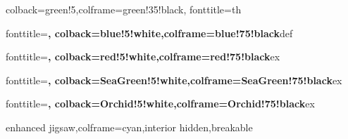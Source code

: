 
\theoremstyle{normalit}
\newtheorem{theorem}{Theorem}[section]
\newtheorem{lemma}{Lemma}[section]
\newtheorem{corollary}{Corollary}[section]
\newtheorem{proposition}{Proposition}[section]
\newtheorem*{theorem*}{Theorem}

\theoremstyle{thmit}
\newtheorem*{solution}{Solution}
\newtheorem*{fsolution}{Solution}

\theoremstyle{normal}
\newtheorem{example}{Example}[section]
\newtheorem{definition}{Definition}[section]
\newtheorem{problem}{Problem}[section]
\newtheorem{question}{Question}[section]
\newtheorem{remark}{Remark}[section]
\newtheorem{properties}{Properties}[section]
\newtheorem{notation}{Notation}[section]
\newtheorem{axiom}{Axiom}[section]
\newtheorem*{properties*}{Properties}
\newtheorem*{remark*}{Remark}
\newtheorem*{definition*}{Definition}
\theoremstyle{plain}

%
    {colback=green!5,colframe=green!35!black,
     fonttitle=\bfseries\upshape}{th}

%
    {fonttitle=\bfseries\upshape,
     colback=blue!5!white,colframe=blue!75!black}{def}

%
    {fonttitle=\bfseries\upshape,
     colback=red!5!white,colframe=red!75!black}{ex}

%
    {fonttitle=\bfseries\upshape,
     colback=SeaGreen!5!white,colframe=SeaGreen!75!black}{ex}

%
    {fonttitle=\bfseries\upshape,
     colback=Orchid!5!white,colframe=Orchid!75!black}{ex}

\newenvironment{bproof}{\textit{Proof.}}{\hfill$\square$}
    {enhanced jigsaw,colframe=cyan,interior hidden,breakable}

